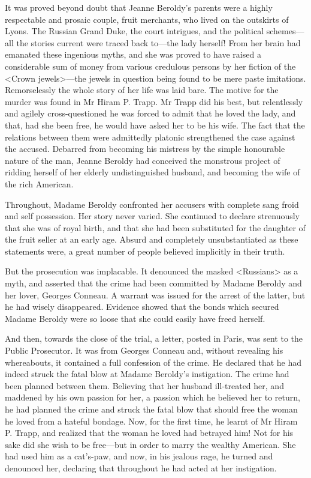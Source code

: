  It was proved beyond doubt that Jeanne Beroldy's parents were a highly respectable and prosaic couple, fruit merchants, who lived on the outskirts of Lyons. The Russian Grand Duke, the court intrigues, and the political schemes—all the stories current were traced back to—the lady herself! From her brain had emanated these ingenious myths, and she was proved to have raised a considerable sum of money from various credulous persons by her fiction of the <Crown jewels>—the jewels in question being found to be mere paste imitations. Remorselessly the whole story of her life was laid bare. The motive for the murder was found in Mr Hiram P. Trapp. Mr Trapp did his best, but relentlessly and agilely cross-questioned he was forced to admit that he loved the lady, and that, had she been free, he would have asked her to be his wife. The fact that the relations between them were admittedly platonic strengthened the case against the accused. Debarred from becoming his mistress by the simple honourable nature of the man, Jeanne Beroldy had conceived the monstrous project of ridding herself of her elderly undistinguished husband, and becoming the wife of the rich American. 

 Throughout, Madame Beroldy confronted her accusers with complete sang froid and self possession. Her story never varied. She continued to declare strenuously that she was of royal birth, and that she had been substituted for the daughter of the fruit seller at an early age. Absurd and completely unsubstantiated as these statements were, a great number of people believed implicitly in their truth. 

 But the prosecution was implacable. It denounced the masked <Russians> as a myth, and asserted that the crime had been committed by Madame Beroldy and her lover, Georges Conneau. A warrant was issued for the arrest of the latter, but he had wisely disappeared. Evidence showed that the bonds which secured Madame Beroldy were so loose that she could easily have freed herself. 

 And then, towards the close of the trial, a letter, posted in Paris, was sent to the Public Prosecutor. It was from Georges Conneau and, without revealing his whereabouts, it contained a full confession of the crime. He declared that he had indeed struck the fatal blow at Madame Beroldy's instigation. The crime had been planned between them. Believing that her husband ill-treated her, and maddened by his own passion for her, a passion which he believed her to return, he had planned the crime and struck the fatal blow that should free the woman he loved from a hateful bondage. Now, for the first time, he learnt of Mr Hiram P. Trapp, and realized that the woman he loved had betrayed him! Not for his sake did she wish to be free—but in order to marry the wealthy American. She had used him as a cat's-paw, and now, in his jealous rage, he turned and denounced her, declaring that throughout he had acted at her instigation. 


